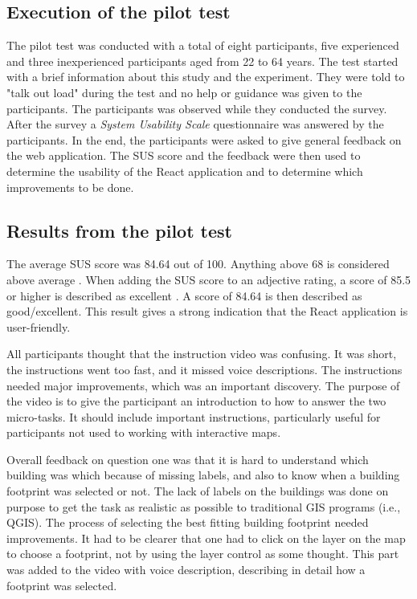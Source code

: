 \subsection{Execution of the pilot test}
The pilot test was conducted with a total of eight participants, five experienced and three inexperienced participants aged from 22 to 64 years. The test started with a brief information about this study and the experiment. They were told to "talk out load" during the test and no help or guidance was given to the participants. The participants was observed while they conducted the survey. After the survey a \textit{System Usability Scale} questionnaire was answered by the participants. In the end, the participants were asked to give general feedback on the web application. The SUS score and the feedback were then used to determine the usability of the React application and to determine which improvements to be done.  

\subsection{Results from the pilot test}
The average SUS score was 84.64 out of 100. Anything above 68 is considered above average \citep{Affairs2013}. When adding the SUS score to an adjective rating, a score of 85.5 or higher is described as excellent \citep{Bangor2009}. A score of 84.64 is then described as good/excellent. This result gives a strong indication that the React application is user-friendly. 

All participants thought that the instruction video was confusing. It was short, the instructions went too fast, and it missed voice descriptions. The instructions needed major improvements, which was an important discovery. The purpose of the video is to give the participant an introduction to how to answer the two micro-tasks. It should include important instructions, particularly useful for participants not used to working with interactive maps. 

Overall feedback on question one was that it is hard to understand which building was which because of missing labels, and also to know when a building footprint was selected or not. The lack of labels on the buildings was done on purpose to get the task as realistic as possible to traditional GIS programs (i.e., QGIS). The process of selecting the best fitting building footprint needed improvements. It had to be clearer that one had to click on the layer on the map to choose a footprint, not by using the layer control as some thought. This part was added to the video with voice description, describing in detail how a footprint was selected.

